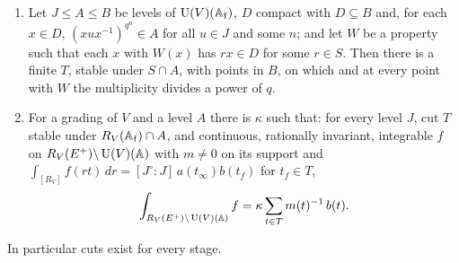 \begin{proposition}\label{prop:coset-sum}
\begin{enumerate}[label=\textup{(\alph*)}]
\item Let $J\le A\le B$ be levels of $\operatorname{U}(V)(\mathbb{A}_{\mathrm f})$, $D$ compact with $D\subseteq B$ and, for each $x\in D$, $(xux^{-1})^{q^n}\in A$
for all $u\in J$ and some $n$; and let $W$ be a property such that each $x$ with $W(x)$ has $rx\in D$ for some $r\in S$. Then
there is a finite $T$, stable under $S\cap A$, with points in $B$, on which and at every point with $W$ the
multiplicity divides a power of $q$.
\item For a grading of $V$ and a level $A$ there is $\kappa$ such that: for every level $J$, cut $T$ stable under
$R_V(\mathbb{A}_{\mathrm f})\cap A$, and continuous, rationally invariant, integrable $f$ on $R_V(E^+)\backslash\operatorname{U}(V)(\mathbb{A})$ with $m\ne0$ on its
support and $\int_{[R_V]}f(rt)\,dr=[J^\circ:J]\,a(t_\infty)b(t_f)$ for $t_f\in T$,
\[
  \int_{R_V(E^+)\backslash\operatorname{U}(V)(\mathbb{A})}f=\kappa\sum_{t\in T}m(t)^{-1}\,b(t).
\]
\end{enumerate}
In particular cuts exist for every stage.
\end{proposition}

